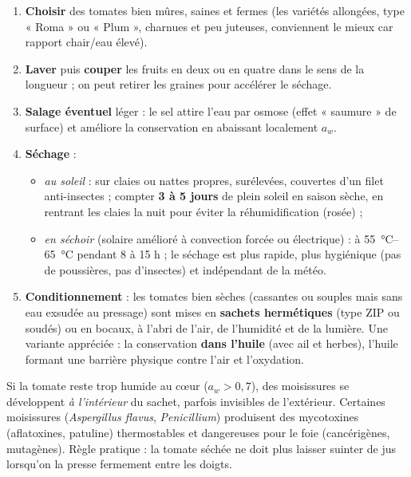 \documentclass[11pt]{article}
\newcommand{\cle}[1]{{\popxbold\color{popdark}#1}}
\begin{document}
\begin{methode}
\begin{enumerate}
\item \textbf{Choisir} des tomates bien mûres, saines et fermes (les variétés allongées, type « Roma » ou « Plum », charnues et peu juteuses, conviennent le mieux car rapport chair/eau élevé).
\item \textbf{Laver} puis \textbf{couper} les fruits en deux ou en quatre dans le sens de la longueur ; on peut retirer les graines pour accélérer le séchage.
\item \textbf{Salage éventuel} léger : le sel attire l'eau par osmose (effet « saumure » de surface) et améliore la conservation en abaissant localement $a_w$.
\item \textbf{Séchage} :
\begin{itemize}
\item \emph{au soleil} : sur claies ou nattes propres, surélevées, couvertes d'un filet anti-insectes ; compter \textbf{3 à 5 jours} de plein soleil en saison sèche, en rentrant les claies la nuit pour éviter la réhumidification (rosée) ;
\item \emph{en séchoir} (solaire amélioré à convection forcée ou électrique) : à \SI{55}{\celsius}--\SI{65}{\celsius} pendant 8 à 15 h ; le séchage est plus rapide, plus hygiénique (pas de poussières, pas d'insectes) et indépendant de la météo.
\end{itemize}
\item \textbf{Conditionnement} : les tomates bien sèches (cassantes ou souples mais sans eau exsudée au pressage) sont mises en \textbf{sachets hermétiques} (type ZIP ou soudés) ou en bocaux, à l'abri de l'air, de l'humidité et de la lumière. Une variante appréciée : la conservation \textbf{dans l'huile} (avec ail et herbes), l'huile formant une barrière physique contre l'air et l'oxydation.
\end{enumerate}
\end{methode}

\begin{attention}
Si la tomate reste trop humide au cœur ($a_w > 0,7$), des moisissures se développent \emph{à l'intérieur} du sachet, parfois invisibles de l'extérieur. Certaines moisissures (\emph{Aspergillus flavus}, \emph{Penicillium}) produisent des \cle{mycotoxines} (aflatoxines, patuline) thermostables et dangereuses pour le foie (cancérigènes, mutagènes). Règle pratique : la tomate séchée ne doit plus laisser suinter de jus lorsqu'on la presse fermement entre les doigts.
\end{attention}
\end{document}
